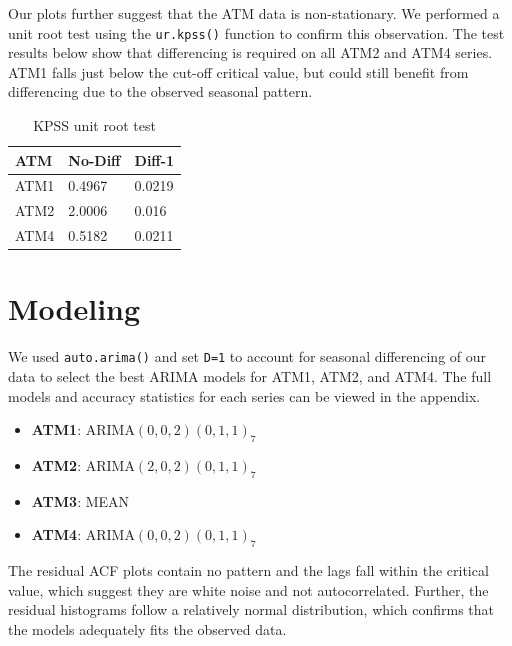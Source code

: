 \documentclass[openany]{book}
\providecommand{\tightlist}{%
  \setlength{\itemsep}{0pt}\setlength{\parskip}{0pt}}
\begin{document}
Our plots further suggest that the ATM data is non-stationary. We
performed a unit root test using the \texttt{ur.kpss()} function to
confirm this observation. The test results below show that differencing
is required on all ATM2 and ATM4 series. ATM1 falls just below the
cut-off critical value, but could still benefit from differencing due to
the observed seasonal pattern.

\begin{table}[H]

\caption{\label{tab:unnamed-chunk-6}KPSS unit root test}
\centering
\begin{tabular}{l|l|l}
\hline
\textbf{ATM} & \textbf{No-Diff} & \textbf{Diff-1}\\
\hline
\rowcolor{gray!6}  ATM1 & 0.4967 & 0.0219\\
\hline
ATM2 & 2.0006 & 0.016\\
\hline
\rowcolor{gray!6}  ATM4 & 0.5182 & 0.0211\\
\hline
\end{tabular}
\end{table}

\hypertarget{modeling}{%
\section{Modeling}\label{modeling}}

We used \texttt{auto.arima()} and set \texttt{D=1} to account for
seasonal differencing of our data to select the best ARIMA models for
ATM1, ATM2, and ATM4. The full models and accuracy statistics for each
series can be viewed in the appendix.

\begin{itemize}
\tightlist
\item
  \textbf{ATM1}: ARIMA\((0,0,2)(0,1,1)_7\)
\item
  \textbf{ATM2}: ARIMA\((2,0,2)(0,1,1)_7\)
\item
  \textbf{ATM3}: MEAN
\item
  \textbf{ATM4}: ARIMA\((0,0,2)(0,1,1)_7\)
\end{itemize}

The residual ACF plots contain no pattern and the lags fall within the
critical value, which suggest they are white noise and not
autocorrelated. Further, the residual histograms follow a relatively
normal distribution, which confirms that the models adequately fits the
observed data.
\end{document}
